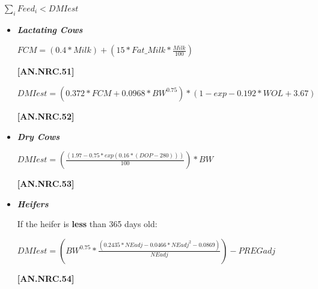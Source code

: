 \begin{refsection}
\begin{center}
    \(\sum_{i}Feed_{i} < DMIest\)
\end{center}

        \begin{itemize}
        \item \textbf{\textit{Lactating Cows}}
                \vspace{0.2cm}
                
\begin{center}
    \(FCM = (0.4 * Milk) + (15 * Fat\_Milk * \frac{Milk}{100})\)
\end{center}

\vspace{0.5cm}
            {\raggedleft \textbf{[AN.NRC.51]}\par}
\vspace{0.5cm}

\begin{center}
    \(DMIest = (0.372 * FCM + 0.0968 * BW^{0.75}) * (1 - exp - 0.192 * WOL + 3.67)\)
\end{center}

\vspace{0.5cm}
            {\raggedleft \textbf{[AN.NRC.52]}\par}
\vspace{0.5cm}

        \item \textbf{\textit{Dry Cows}}
\vspace{0.5cm}

\begin{center}
    \(DMIest = (\frac{(1.97 - 0.75 * exp(0.16 * (DOP - 280)))}{100}) * BW\)
\end{center}

\vspace{0.5cm}
            {\raggedleft \textbf{[AN.NRC.53]}\par}
\vspace{0.5cm}

        \item \textbf{\textit{Heifers}}
\vspace{0.5cm}

If the heifer is \textbf{less} than 365 days old:
\begin{center}
    \(DMIest = (BW^{0.75} * \frac{(0.2435 * NEadj - 0.0466 * NEadj^{2} - 0.0869)}{NEadj}) - PREGadj \)
\end{center}

\vspace{0.5cm}
            {\raggedleft \textbf{[AN.NRC.54]}\par}
\vspace{0.5cm}


\end{itemize}
\end{refsection}
